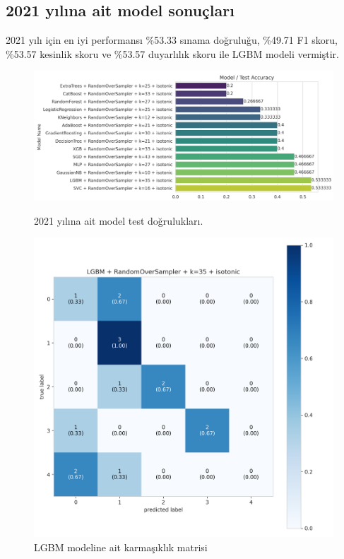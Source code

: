\newpage

\subsection{2021 yılına ait model sonuçları}
2021 yılı için en iyi performansı \%53.33 sınama doğruluğu,  \%49.71 F1 skoru, \%53.57 kesinlik skoru ve \%53.57 duyarlılık skoru ile LGBM modeli vermiştir.

\begin{figure}[ht]
\centering
\begin{minipage}[b]{0.6\textwidth}
    \centering
    \includegraphics[width=\textwidth]{2021.png}
    \caption{2021 yılına ait model test doğrulukları.}
    \label{fig:resim1}
\end{minipage}
\hfill
\begin{minipage}[b]{0.6\textwidth}
    \centering
    \includegraphics[width=\textwidth]{2021_cm.png}
    \caption{LGBM modeline ait karmaşıklık matrisi}
    \label{fig:resim2}
\end{minipage}
\end{figure}


